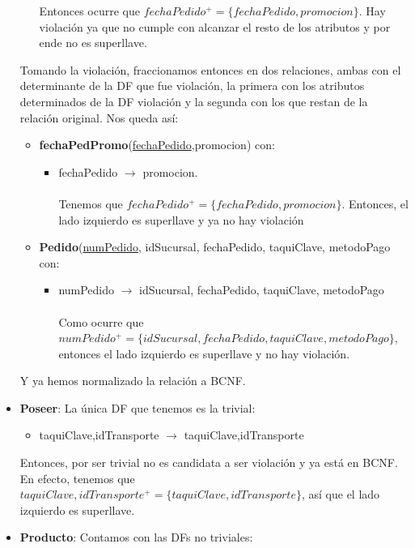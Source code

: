 \documentclass[11pt,letterpaper]{article}
\begin{document}
\begin{itemize}
\begin{itemize}
Entonces ocurre que $fechaPedido^+ = \{fechaPedido,promocion\}$. Hay violación ya que no cumple con alcanzar el resto de los atributos y por ende no es superllave. 
\end{itemize}

Tomando la violación, fraccionamos entonces en dos relaciones, ambas con el determinante de la DF que fue violación, la primera con los atributos determinados de la DF violación y la segunda con los que restan de la relación original. Nos queda así:

\begin{itemize}
\item {\footnotesize \textbf{fechaPedPromo}(\underline{fechaPedido},promocion)} con:
\begin{itemize}
\item fechaPedido $\rightarrow$ promocion.\\\\ Tenemos que $fechaPedido^+ = \{fechaPedido,promocion\}$. Entonces, el lado izquierdo es superllave y ya no hay violación \checkmark
\end{itemize}
\item {\footnotesize \textbf{Pedido}(\underline{numPedido}, idSucursal, fechaPedido, taquiClave, metodoPago} con:
\begin{itemize}
\item numPedido $\rightarrow$ idSucursal, fechaPedido, taquiClave, metodoPago\\\\Como ocurre que $numPedido^+=\{idSucursal, fechaPedido, taquiClave, metodoPago\}$, entonces el lado izquierdo es superllave y no hay violación. \checkmark
\end{itemize}
\end{itemize}

Y ya hemos normalizado la relación a BCNF.
\item \textbf{Poseer}: La única DF que tenemos es la trivial:

\begin{itemize}
\item taquiClave,idTransporte $\rightarrow$ taquiClave,idTransporte
\end{itemize}

Entonces, por ser trivial no es candidata a ser violación y ya está en BCNF. En efecto, tenemos que $taquiClave,idTransporte^+ = \{taquiClave,idTransporte\}$, así que el lado izquierdo es superllave. \checkmark
\item \textbf{Producto}: Contamos con las DFs no triviales:


\end{itemize}
\end{document}
